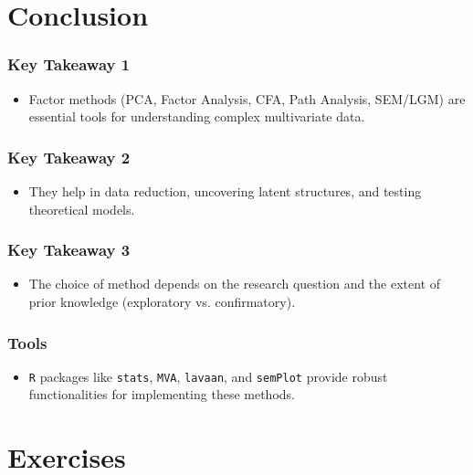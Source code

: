 \documentclass{beamer}
\newcommand{\code}[1]{\texttt{#1}}
\begin{document}
\section{Conclusion}

\begin{frame}
    \frametitle{Key Takeaway 1}
    \begin{itemize}
        \item Factor methods (PCA, Factor Analysis, CFA, Path Analysis, SEM/LGM) are essential tools for understanding complex multivariate data.
    \end{itemize}
\end{frame}

\begin{frame}
    \frametitle{Key Takeaway 2}
    \begin{itemize}
        \item They help in \alert{data reduction}, uncovering \alert{latent structures}, and \alert{testing theoretical models}.
    \end{itemize}
\end{frame}

\begin{frame}
    \frametitle{Key Takeaway 3}
    \begin{itemize}
        \item The choice of method depends on the research question and the extent of prior knowledge (exploratory vs. confirmatory).
    \end{itemize}
\end{frame}

\begin{frame}
    \frametitle{Tools}
    \begin{itemize}
        \item \code{R} packages like \code{stats}, \code{MVA}, \code{lavaan}, and \code{semPlot} provide robust functionalities for implementing these methods.
    \end{itemize}
\end{frame}
\section{Exercises}
\end{document}
